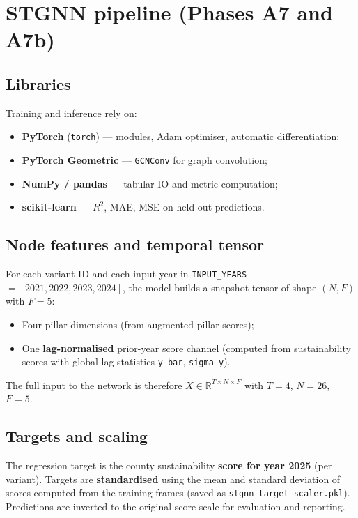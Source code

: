 \documentclass[11pt,a4paper]{article}
\begin{document}
\section{STGNN pipeline (Phases A7 and A7b)}
\subsection{Libraries}
Training and inference rely on:
\begin{itemize}
  \item \textbf{PyTorch} (\texttt{torch}) --- modules, Adam optimiser, automatic differentiation;
  \item \textbf{PyTorch Geometric} --- \texttt{GCNConv} for graph convolution;
  \item \textbf{NumPy / pandas} --- tabular IO and metric computation;
  \item \textbf{scikit-learn} --- $R^2$, MAE, MSE on held-out predictions.
\end{itemize}

\subsection{Node features and temporal tensor}
For each variant ID and each input year in \texttt{INPUT\_YEARS}${}=[2021,2022,2023,2024]$, the model builds a snapshot tensor of shape $(N, F)$ with $F=5$:
\begin{itemize}
  \item Four pillar dimensions (from augmented pillar scores);
  \item One \textbf{lag-normalised} prior-year score channel (computed from sustainability scores with global lag statistics \texttt{y\_bar}, \texttt{sigma\_y}).
\end{itemize}
The full input to the network is therefore $X \in \mathbb{R}^{T \times N \times F}$ with $T=4$, $N=26$, $F=5$.

\subsection{Targets and scaling}
The regression target is the county sustainability \textbf{score for year 2025} (per variant). Targets are \textbf{standardised} using the mean and standard deviation of scores computed from the training frames (saved as \texttt{stgnn\_target\_scaler.pkl}). Predictions are inverted to the original score scale for evaluation and reporting.
\end{document}
